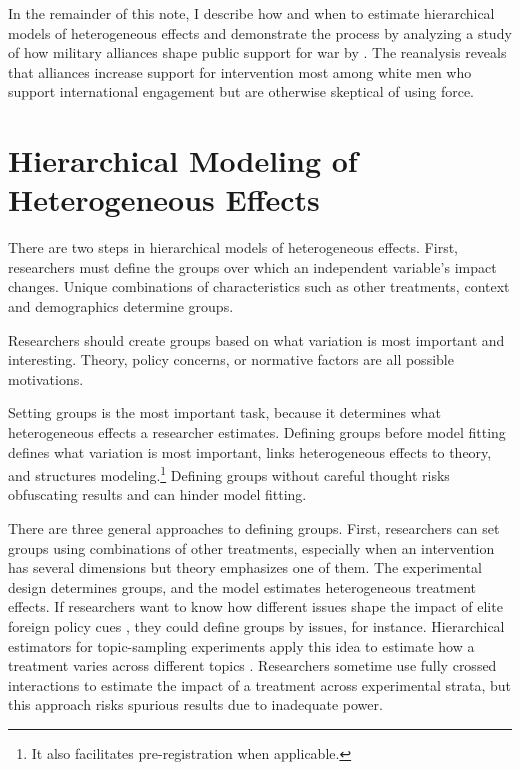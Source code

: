 \documentclass[12pt]{article}
\begin{document}
In the remainder of this note, I describe how and when to estimate hierarchical models of heterogeneous effects and demonstrate the process by analyzing a study of how military alliances shape public support for war by \citet{TomzWeeks2021}. 
The reanalysis reveals that alliances increase support for intervention most among white men who support international engagement but are otherwise skeptical of using force. 



\section{Hierarchical Modeling of Heterogeneous Effects}


There are two steps in hierarchical models of heterogeneous effects. 
First, researchers must define the groups over which an independent variable's impact changes. 
Unique combinations of characteristics such as other treatments, context and demographics determine groups.


Researchers should create groups based on what variation is most important and interesting. 
Theory, policy concerns, or normative factors are all possible motivations. 


Setting groups is the most important task, because it determines what heterogeneous effects a researcher estimates. 
Defining groups before model fitting defines what variation is most important, links heterogeneous effects to theory, and structures modeling.\footnote{It also facilitates pre-registration when applicable.}
Defining groups without careful thought risks obfuscating results and can hinder model fitting.   


There are three general approaches to defining groups.  
First, researchers can set groups using combinations of other treatments, especially when an intervention has several dimensions but theory emphasizes one of them. 
The experimental design determines groups, and the model estimates heterogeneous treatment effects.   
If researchers want to know how different issues shape the impact of elite foreign policy cues \citep{GuisingerSaunders2017}, they could define groups by issues, for instance.
Hierarchical estimators for topic-sampling experiments apply this idea to estimate how a treatment varies across different topics \citep{CliffordRainey2023}. 
Researchers sometime use fully crossed interactions to estimate the impact of a treatment across experimental strata, but this approach risks spurious results due to inadequate power. 
\end{document}
